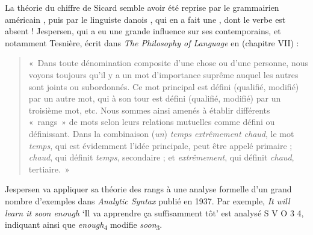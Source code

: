 {    La théorie du chiffre de Sicard semble avoir été reprise par le grammairien américain , puis par le linguiste danois , qui en a fait une , dont le verbe est absent ! Jespersen, qui a eu une grande influence sur ses contemporains, et notamment Tesnière, écrit dans \textit{The Philosophy of Language} en \citeyear{jespersen1924philosophy} (chapitre VII) : 
    \begin{quote}«~Dans toute dénomination composite d’une chose ou d’une personne, nous voyons toujours qu’il y a un mot d’importance suprême auquel les autres sont joints ou subordonnés. Ce mot principal est défini (qualifié, modifié) par un autre mot, qui à son tour est défini (qualifié, modifié) par un troisième mot, etc. Nous sommes ainsi amenés à établir différents «~rangs~» de mots selon leurs relations mutuelles comme défini ou définissant. Dans la combinaison (\textit{un}) \textit{temps extrêmement chaud}, le mot \textit{temps}, qui est évidemment l’idée principale, peut être appelé primaire ; \textit{chaud}, qui définit \textit{temps}, secondaire ; et \textit{extrêmement}, qui définit \textit{chaud}, tertiaire.~»  \end{quote}
    Jespersen va appliquer sa théorie des rangs à une analyse formelle d’un grand nombre d’exemples dans \textit{Analytic Syntax} publié en 1937. Par exemple, \textit{It will learn it soon enough} ‘Il va apprendre ça suffisamment tôt’ est analysé S V O 3 4, indiquant ainsi que \textit{enough}\textsubscript{4} modifie \textit{soon}\textsubscript{3}.

}
